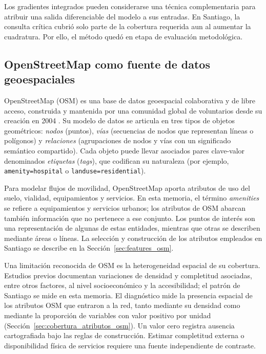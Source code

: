 Los gradientes integrados pueden considerarse una técnica complementaria para atribuir una salida diferenciable del modelo a sus entradas. En Santiago, la consulta crítica cubrió solo parte de la cobertura requerida aun al aumentar la cuadratura. Por ello, el método quedó en etapa de evaluación metodológica.

\subsection{OpenStreetMap como fuente de datos geoespaciales}

OpenStreetMap (OSM) es una base de datos geoespacial colaborativa y de libre acceso, construida y mantenida por una comunidad global de voluntarios desde su creación en 2004 \cite{haklay2008openstreetmap}. Su modelo de datos se articula en tres tipos de objetos geométricos: \textit{nodos} (puntos), \textit{vías} (secuencias de nodos que representan líneas o polígonos) y \textit{relaciones} (agrupaciones de nodos y vías con un significado semántico compartido). Cada objeto puede llevar asociados pares clave-valor denominados \textit{etiquetas} (\textit{tags}), que codifican su naturaleza (por ejemplo, \texttt{amenity=hospital} o \texttt{landuse=residential}).

Para modelar flujos de movilidad, OpenStreetMap aporta atributos de uso del suelo, vialidad, equipamientos y servicios. En esta memoria, el término \textit{amenities} se refiere a equipamientos y servicios urbanos; los atributos de OSM abarcan también información que no pertenece a ese conjunto. Los puntos de interés son una representación de algunas de estas entidades, mientras que otras se describen mediante áreas o líneas. La selección y construcción de los atributos empleados en Santiago se describe en la Sección~\ref{sec:features_osm}.

Una limitación reconocida de OSM es la heterogeneidad espacial de su cobertura. Estudios previos \cite{BarringtonLeigh2017} documentan variaciones de densidad y completitud asociadas, entre otros factores, al nivel socioeconómico y la accesibilidad; el patrón de Santiago se mide en esta memoria. El diagnóstico mide la presencia espacial de los atributos OSM que entraron a la red, tanto mediante su densidad como mediante la proporción de variables con valor positivo por unidad (Sección~\ref{sec:cobertura_atributos_osm}). Un valor cero registra ausencia cartografiada bajo las reglas de construcción. Estimar completitud externa o disponibilidad física de servicios requiere una fuente independiente de contraste.

